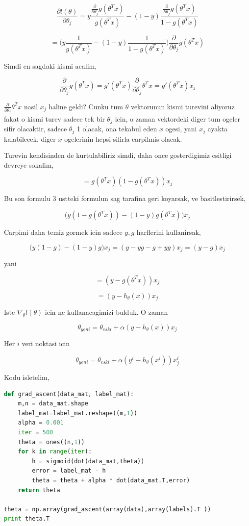 \documentclass[12pt,fleqn]{article}\usepackage{../common}
\begin{document}
$$ 
\frac{\partial l(\theta)}{\partial \theta_j} =
y 
\frac{\frac{\partial }{\partial \theta_j}g(\theta^Tx) }{g(\theta^Tx)} 
-
(1-y) 
\frac{\frac{\partial }{\partial \theta_j}g(\theta^Tx) }{1-g(\theta^Tx)} 
$$

$$ 
= \big(
y 
\frac{1}{g(\theta^Tx)} 
-
(1-y) 
\frac{1}{1-g(\theta^Tx)} 
\big)
\frac{\partial }{\partial \theta_j}g(\theta^Tx)
$$

Simdi en sagdaki kismi acalim,

$$ 
\frac{\partial }{\partial \theta_j}g(\theta^Tx) 
= g'(\theta^Tx) \frac{\partial }{\partial \theta_j} \theta^Tx 
= g'(\theta^Tx) x_j 
 $$

$\frac{\partial }{\partial \theta_j} \theta^Tx$ nasil $x_j$ haline
geldi?  Cunku tum $\theta$ vektorunun kismi turevini aliyoruz fakat o
kismi turev sadece tek bir $\theta_j$ icin, o zaman vektordeki diger
tum ogeler sifir olacaktir, sadece $\theta_j$ 1 olacak, ona tekabul
eden $x$ ogesi, yani $x_j$ ayakta kalabilecek, diger $x$ ogelerinin
hepsi sifirla carpilmis olacak.

Turevin kendisinden de kurtulabiliriz simdi, daha once gosterdigimiz esitligi
devreye sokalim,

$$ 
= g(\theta^Tx)(1-g(\theta^Tx)) x_j 
$$

Bu son formulu 3 ustteki formulun sag tarafina geri koyarsak, ve
basitlestirirsek,

$$
\big(
y(1-g(\theta^Tx)) - (1-y)g(\theta^T x)
\big) x_j
 $$

Carpimi daha temiz gormek icin sadece $y,g$ harflerini kullanirsak,

$$
\big(y(1-g) - (1-y)g \big) x_j =
(y - yg - g + yg)x_j = (y - g)x_j
 $$

yani

$$
= (y - g(\theta^Tx))x_j
$$

$$
= (y - h_\theta(x))x_j
$$

Iste $\nabla_\theta l(\theta)$ icin ne kullanacagimizi bulduk. O zaman

$$ \theta_{yeni} = \theta_{eski} + \alpha (y - h_\theta(x))x_j $$

Her $i$ veri noktasi icin

$$ \theta_{yeni} = \theta_{eski} + \alpha (y^{i} - h_\theta(x^{i}))x^{i}_j $$

Kodu isletelim,

\begin{lstlisting}[language=Python]
def grad_ascent(data_mat, label_mat):
    m,n = data_mat.shape
    label_mat=label_mat.reshape((m,1))
    alpha = 0.001
    iter = 500
    theta = ones((n,1))
    for k in range(iter):   
        h = sigmoid(dot(data_mat,theta))
        error = label_mat - h
        theta = theta + alpha * dot(data_mat.T,error) 
    return theta

theta = np.array(grad_ascent(array(data),array(labels).T ))
print theta.T
\end{lstlisting}
\end{document}
